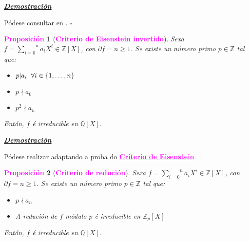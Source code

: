 \documentclass[twoside]{report}
\newcommand{\magbf}[1]{\textcolor{magenta}{\textbf{#1}}} %
\theoremstyle{mystyle}
\newtheorem{prop}{\magbf{Proposición}}[chapter]
\newenvironment{proposition}
{\begin{mdframed}[linecolor = magenta,backgroundcolor = classicrose, linewidth = 2mm]\begin{prop}}
{\end{prop}\end{mdframed}}
\begin{document}
\vspace{2mm}

\noindent \textbf{\textit{\underline{Demostración}}}

\vspace{2mm}

\noindent Pódese consultar en \cite{fraleigh}. $\square$\\

\vspace{3mm}

\begin{proposition}[\magbf{Criterio de Eisenstein invertido}] \label{prop2.27}
Sexa $f = \overset{n}{\underset{i = 0}{\sum}}a_{i}X^{i} \in \mathbb{Z}[X]$, con $\partial f = n \geq 1$. Se existe un número primo $p \in \mathbb{Z}$ tal que:
\begin{itemize}
    \item $p|a_{i} \hspace{2mm} \forall i \in \{1, \ldots, n\}$
    \item $p \nmid a_{0}$
    \item $p^{2} \nmid a_{n}$
\end{itemize}
\noindent Entón, $f$ é irreducible en $\mathbb{Q}[X]$.
\end{proposition}

\vspace{2mm}

\noindent \textbf{\textit{\underline{Demostración}}}

\vspace{2mm}

\noindent Pódese realizar adaptando a proba do \hyperref[prop2.26]{\magbf{Criterio de Eisenstein}}. $\square$\\

\vspace{3mm}

\begin{proposition}[\magbf{Criterio de redución}] \label{prop2.28}
Sexa $f = \overset{n}{\underset{i = 0}{\sum}}a_{i}X^{i} \in \mathbb{Z}[X]$, con $\partial f = n \geq 1$. Se existe un número primo $p \in \mathbb{Z}$ tal que:
\begin{itemize}
    \item $p \nmid a_{n}$
    \item A redución de $f$ módulo $p$ é irreducible en $\mathbb{Z}_{p}[X]$
\end{itemize}
\noindent Entón, $f$ é irreducible en $\mathbb{Q}[X]$.
\end{proposition}
\end{document}
